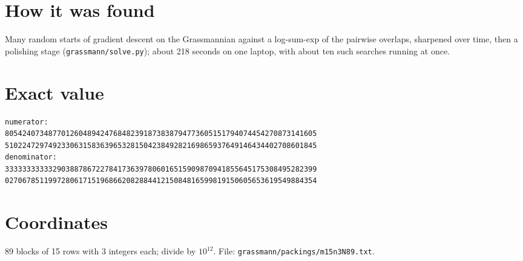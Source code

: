\documentclass[11pt,a4paper]{article}
\begin{document}
\section{How it was found}
Many random starts of gradient descent on the Grassmannian against a log-sum-exp of the pairwise overlaps, sharpened over time, then a polishing stage (\texttt{grassmann/solve.py}); about 218 seconds on one laptop, with about ten such searches running at once.


\appendix
\section{Exact value}
{\small
\begin{verbatim}
numerator:
805424073487701260489424768482391873838794773605151794074454270873141605
510224729749233063158363965328150423849282169865937649146434402708601845
denominator:
333333333332903887867227841736397806016515909870941855645175308495282399
027067851199728061715196866208288441215084816599819150605653619549884354
\end{verbatim}}

\section{Coordinates}
89 blocks of 15 rows with 3 integers each; divide by $10^{12}$. File: \texttt{grassmann/packings/m15n3N89.txt}.
{\tiny
\begin{multicols}{3}
\end{multicols}}
\end{document}
